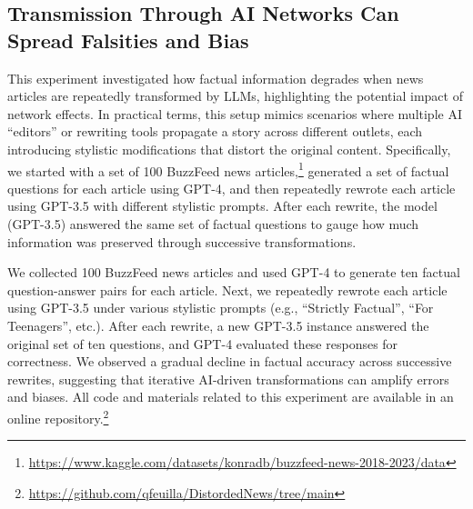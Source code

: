 \subsection{Transmission Through AI Networks Can Spread Falsities and Bias}


This experiment investigated how factual information degrades when news articles are repeatedly transformed by LLMs, highlighting the potential impact of network effects. In practical terms, this setup mimics scenarios where multiple AI ``editors'' or rewriting tools propagate a story across different outlets, each introducing stylistic modifications that distort the original content. Specifically, we started with a set of 100 BuzzFeed news articles,\footnote{\url{https://www.kaggle.com/datasets/konradb/buzzfeed-news-2018-2023/data}} generated a set of factual questions for each article using GPT-4, and then repeatedly rewrote each article using GPT-3.5 with different stylistic prompts. After each rewrite, the model (GPT-3.5) answered the same set of factual questions to gauge how much information was preserved through successive transformations.


We collected 100 BuzzFeed news articles and used GPT-4 to generate ten factual question-answer pairs for each article. Next, we repeatedly rewrote each article using GPT-3.5 under various stylistic prompts (e.g., ``Strictly Factual'', ``For Teenagers'', etc.). After each rewrite, a new GPT-3.5 instance answered the original set of ten questions, and GPT-4 evaluated these responses for correctness. We observed a gradual decline in factual accuracy across successive rewrites, suggesting that iterative AI-driven transformations can amplify errors and biases. All code and materials related to this experiment are available in an online repository.\footnote{\url{https://github.com/qfeuilla/DistordedNews/tree/main}}









































